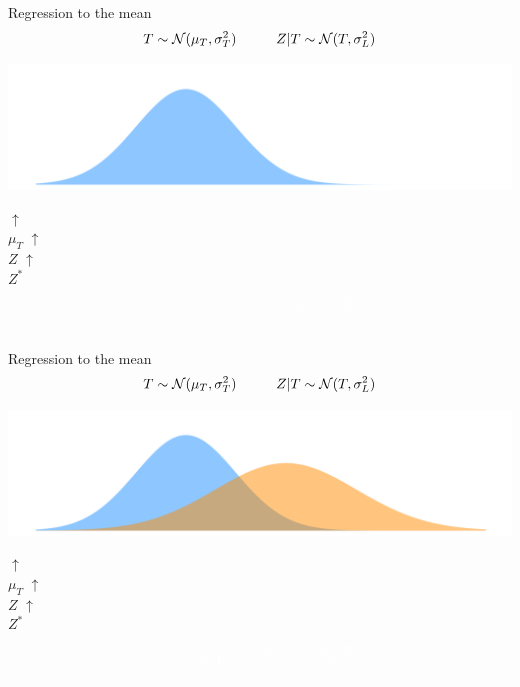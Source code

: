 \documentclass{beamer}
\begin{document}
\begin{frame}{Regression to the mean}
$$T \sim \mathcal N(\mu_T, \sigma^2_T) \hspace{1cm}
Z|T \sim \mathcal N(T, \sigma^2_L)$$
\begin{center}
\includegraphics[width = \textwidth]{../figs/talent.pdf}\\
\end{center}
\vspace{-6mm}\tabto*{37mm}$\uparrow$\\
\tabto*{36mm}$\mu_T$
\pause
\vspace{-5mm}\tabto*{58mm}$\uparrow$\\
\tabto*{57.5mm}$Z$
{\color{white}
\vspace{-4.5mm}\tabto*{44mm}$\uparrow$\\
\tabto*{43mm}$Z^*$\\}
$${\color{white} Z^* = E[T|Z] = \frac{\sigma_T^{-2}\mu_T + \sigma_L^{-2}Z}
    {\sigma_T^{-2} + \sigma_L^{-2}} }$$
\end{frame}

\begin{frame}{Regression to the mean}
$$T \sim \mathcal N(\mu_T, \sigma^2_T) \hspace{1cm}
Z|T \sim \mathcal N(T, \sigma^2_L)$$
\begin{center}
\includegraphics[width = \textwidth]{../figs/talent-skill.pdf}
\end{center}
\vspace{-6mm}\tabto*{37mm}$\uparrow$\\
\tabto*{36mm}$\mu_T$
\vspace{-5mm}\tabto*{58mm}$\uparrow$\\
\tabto*{57.5mm}$Z$
{\color{white}
\vspace{-4.5mm}\tabto*{44mm}$\uparrow$\\
\tabto*{43mm}$Z^*$\\}
$${\color{white} Z^* = E[T|Z] = \frac{\sigma_T^{-2}\mu_T + \sigma_L^{-2}Z}
    {\sigma_T^{-2} + \sigma_L^{-2}} }$$
\end{frame}
\end{document}
